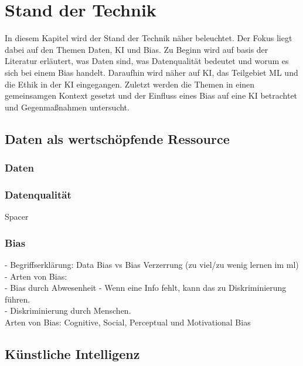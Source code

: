 \chapter{Stand der Technik}
    \begin{onehalfspace}  
        \label{sec:theorie/standdertechnik}
            In diesem Kapitel wird der Stand der Technik näher beleuchtet. Der Fokus liegt dabei auf den Themen Daten, \ac{KI} und Bias. Zu Beginn wird auf basis der Literatur erläutert, was Daten sind, was Datenqualität bedeutet und worum es sich bei einem Bias handelt. Daraufhin wird näher auf \ac{KI}, das Teilgebiet \ac{ML} und die Ethik in der \ac{KI} eingegangen. Zuletzt werden die Themen in einen gemeinsamgen Kontext gesetzt und der Einfluss eines Bias auf eine \ac{KI} betrachtet und Gegenmaßnahmen untersucht. 
        
        \section{Daten als wertschöpfende Ressource}
        \label{subsec:datenchapter}
        \subsection{Daten}
        \label{subsubsec:daten}

            \cite{Otto2019}

        \subsection{Datenqualität}
        \label{subsubsec:datenqualität}
            Spacer

        \subsection{Bias}
        \label{subsubsec:Bias}
            -   Begriffserklärung: Data Bias vs Bias Verzerrung (zu viel/zu wenig lernen im ml)\\
            -   Arten von Bias: \\
                -   Bias durch Abwesenheit - Wenn eine Info fehlt, kann das zu Diskriminierung führen. \\
                -   Diskriminierung durch Menschen. \\
            Arten von Bias: Cognitive, Social, Perceptual und Motivational Bias \cite{Parkavi2018}
 

        \newpage
        \section{Künstliche Intelligenz}
        \label{subsec:KIandML}

\end{onehalfspace}
